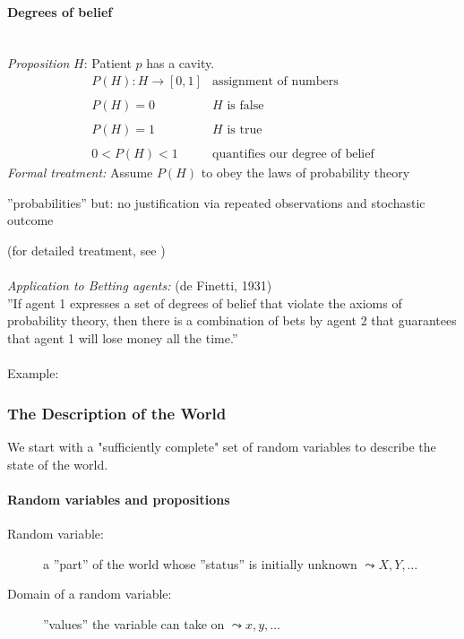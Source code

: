 \paragraph{Degrees of belief}\mbox{}\\
\emph{Proposition} $H$: Patient $p$ has a cavity.
\[ \begin{array}{ll}
	P(H): H \rightarrow [0,1] 
	& \text{assignment of numbers} \\\\
	P(H) = 0
	& H \text{ is false} \\\\
	P(H) = 1
	& H \text{ is true} \\\\
	0 < P(H) < 1
	& \text{quantifies our degree of belief}
\end{array} \]
\emph{Formal treatment:} Assume $P(H)$ to obey the laws of probability theory
\begin{itemize}
  \itl ''probabilities''
  \itl but: no justification via repeated observations and stochastic outcome
\end{itemize}
(for detailed treatment, see \cite{Jaynes2003})
\\\\
\emph{Application to Betting agents:} (de Finetti, 1931)
\\
''If agent 1 expresses a set of degrees of belief that violate the
axioms of probability theory, then there is a combination of bets by
agent 2 that guarantees that agent 1 will lose money all the time.''
\\\\
Example: \textcite[p.474]{RussellNorvig2003}


\subsubsection{The Description of the World}
We start with a "sufficiently complete" set of random variables to describe the state of the world. 

\paragraph{Random variables and propositions}
\begin{description}
\item[Random variable:] a ''part'' of the world whose ''status'' is initially unknown  $\leadsto X, Y, \ldots$
\item[Domain of a random variable:] ''values'' the variable can take on 
\indent $\leadsto x, y, \ldots$
\end{description}
